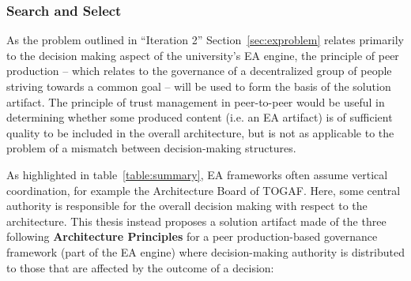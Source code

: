 \subsubsection*{Search and Select}
%
%
As the problem outlined in ``Iteration 2'' Section~\ref{sec:exproblem} relates primarily to the decision making aspect of the university's EA engine, the principle of peer production -- which relates to the governance of a decentralized group of people striving towards a common goal -- will be used to form the basis of the solution artifact.  The principle of trust management in peer-to-peer would be useful in determining whether some produced content (i.e. an EA artifact) is of sufficient quality to be included in the overall architecture, but is not as applicable to the problem of a mismatch between decision-making structures. 

As highlighted in table~\ref{table:summary}, EA frameworks often assume vertical coordination, for example the Architecture Board of TOGAF. Here, some central authority is responsible for the overall decision making with respect to the architecture. This thesis instead proposes a solution artifact made of the three following \textbf{Architecture Principles} for a peer production-based governance framework (part of the EA engine) where decision-making authority is distributed to those that are affected by the outcome of a decision:

